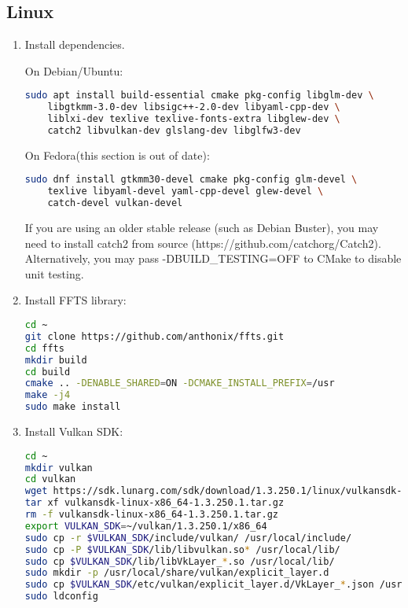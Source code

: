 \subsection{Linux}
\begin{enumerate}

\item Install dependencies.

On Debian/Ubuntu:

\begin{lstlisting}[language=sh, numbers=none]
sudo apt install build-essential cmake pkg-config libglm-dev \
	libgtkmm-3.0-dev libsigc++-2.0-dev libyaml-cpp-dev \
	liblxi-dev texlive texlive-fonts-extra libglew-dev \
	catch2 libvulkan-dev glslang-dev libglfw3-dev
\end{lstlisting}

On Fedora(this section is out of date):

\begin{lstlisting}[language=sh, numbers=none]
sudo dnf install gtkmm30-devel cmake pkg-config glm-devel \
	texlive libyaml-devel yaml-cpp-devel glew-devel \
	catch-devel vulkan-devel
\end{lstlisting}

If you are using an older stable release (such as Debian Buster), you may need to install catch2 from source
(https://github.com/catchorg/Catch2). Alternatively, you may pass -DBUILD\_TESTING=OFF to CMake to disable unit testing.

\item Install FFTS library:

\begin{lstlisting}[language=sh, numbers=none]
cd ~
git clone https://github.com/anthonix/ffts.git
cd ffts
mkdir build
cd build
cmake .. -DENABLE_SHARED=ON -DCMAKE_INSTALL_PREFIX=/usr
make -j4
sudo make install
\end{lstlisting}

\item Install Vulkan SDK:

\begin{lstlisting}[language=sh, numbers=none]
cd ~
mkdir vulkan
cd vulkan
wget https://sdk.lunarg.com/sdk/download/1.3.250.1/linux/vulkansdk-linux-x86_64-1.3.250.1.tar.gz
tar xf vulkansdk-linux-x86_64-1.3.250.1.tar.gz
rm -f vulkansdk-linux-x86_64-1.3.250.1.tar.gz
export VULKAN_SDK=~/vulkan/1.3.250.1/x86_64
sudo cp -r $VULKAN_SDK/include/vulkan/ /usr/local/include/
sudo cp -P $VULKAN_SDK/lib/libvulkan.so* /usr/local/lib/
sudo cp $VULKAN_SDK/lib/libVkLayer_*.so /usr/local/lib/
sudo mkdir -p /usr/local/share/vulkan/explicit_layer.d
sudo cp $VULKAN_SDK/etc/vulkan/explicit_layer.d/VkLayer_*.json /usr/local/share/vulkan/explicit_layer.d
sudo ldconfig
\end{lstlisting}


\end{enumerate}
